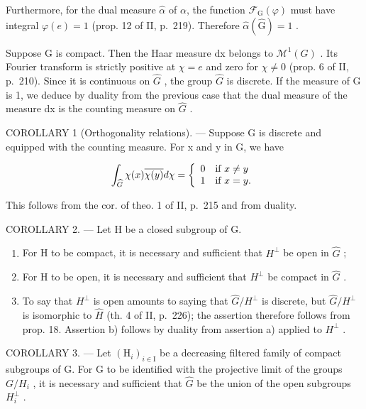 Furthermore, for the dual measure \(\widehat{\alpha}\) of \(\alpha\), the function \(\mathcal{F}_{\mathrm{G}}(\varphi)\) must have integral \(\varphi(e)=1\) (prop. 12 of II, p.~219). Therefore \(\widehat{\alpha}(\widehat{\mathrm{G}})=1\) .

Suppose G is compact. Then the Haar measure dx belongs to \(\mathcal{M}^{1}(G)\) . Its Fourier transform is strictly positive at \(\chi = e\) and zero for \(\chi \neq 0\) (prop. 6 of II, p.~210). Since it is continuous on \(\widehat{G}\) , the group \(\widehat{G}\) is discrete. If the measure of G is 1, we deduce by duality from the previous case that the dual measure of the measure dx is the counting measure on \(\widehat{G}\) .

COROLLARY 1 (Orthogonality relations). --- Suppose G is discrete and equipped with the counting measure. For x and y in G, we have

\[
\int_ {\widehat {G}} \chi (x) \overline {{\chi (y)}} d \chi = \left\{ \begin{array}{l l} 0 & \text{if } x \neq y \\ 1 & \text{if } x = y. \end{array} \right.
\]

This follows from the cor. of theo. 1 of II, p.~215 and from duality.

COROLLARY 2. --- Let H be a closed subgroup of G.

\begin{enumerate}
\def\labelenumi{\alph{enumi})}
\item
  For H to be compact, it is necessary and sufficient that \(H^{\perp}\) be open in \(\widehat{G}\) ;
\item
  For H to be open, it is necessary and sufficient that \(H^{\perp}\) be compact in \(\widehat{G}\) .
\item
  To say that \(H^{\perp}\) is open amounts to saying that \(\widehat{G}/H^{\perp}\) is discrete, but \(\widehat{G}/H^{\perp}\) is isomorphic to \(\widehat{H}\) (th. 4 of II, p.~226); the assertion therefore follows from prop. 18. Assertion b) follows by duality from assertion a) applied to \(H^{\perp}\) .
\end{enumerate}

COROLLARY 3. --- Let \((\mathrm{H}_{i})_{i\in\mathrm{I}}\) be a decreasing filtered family of compact subgroups of G. For G to be identified with the projective limit of the groups \(G/H_{i}\) , it is necessary and sufficient that \(\hat{G}\) be the union of the open subgroups \(H_{i}^{\perp}\) .

